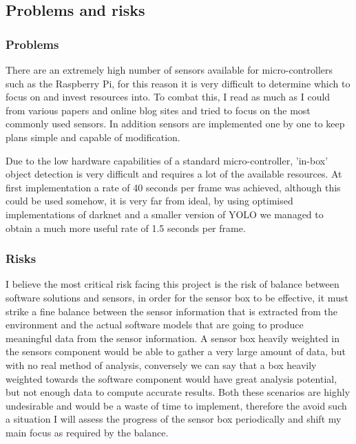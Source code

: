 \documentclass[11pt]{article}
\begin{document}
\medskip




\subsection{Problems and risks}\label{problems-and-risks}

\subsubsection{Problems}\label{problems}
There are an extremely high number of sensors available for micro-controllers such as the Raspberry Pi, for this reason it is very difficult to determine which to focus on and invest resources into. To combat this, I read as much as I could from various papers and online blog sites and tried to focus on the most commonly used sensors. In addition sensors are implemented one by one to keep plans simple and capable of modification.

Due to the low hardware capabilities of a standard micro-controller, 'in-box' object detection is very difficult and requires a lot of the available resources. At first implementation a rate of 40 seconds per frame was achieved, although this could be used somehow, it is very far from ideal, by using optimised implementations of darknet and a smaller version of YOLO we managed to obtain a much more useful rate of 1.5 seconds per frame.

\subsubsection{Risks}\label{risks}
I believe the most critical risk facing this project is the risk of balance between software solutions and sensors, in order for the sensor box to be effective, it must strike a fine balance between the sensor information that is extracted from the environment and the actual software models that are going to produce meaningful data from the sensor information. A sensor box heavily weighted in the sensors component would be able to gather a very large amount of data, but with no real method of analysis, conversely we can say that a box heavily weighted towards the software component would have great analysis potential, but not enough data to compute accurate results. Both these scenarios are highly undesirable and would be a waste of time to implement, therefore the avoid such a situation I will assess the progress of the sensor box periodically and shift my main focus as required by the balance.
\end{document}
